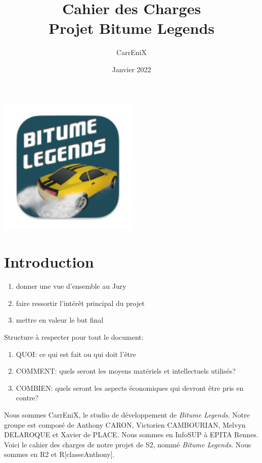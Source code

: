 \documentclass[11pt,a4paper]{article}
\newcommand{\btmlgs}{\textit{Bitume Legends}}
\begin{document}
\title{Cahier des Charges \\ {\large Projet Bitume Legends}}
\author{CarrEniX}
\date{Janvier 2022}
\maketitle

\begin{center}
  \includegraphics[width=0.5\textwidth]{Medias/logo192.png}
\end{center}

\tableofcontents
\clearpage

\section{Introduction}
  \begin{enumerate}
    \item donner une vue d'ensemble au Jury
    \item faire ressortir l'intérêt principal du projet
    \item mettre en valeur le but final
  \end{enumerate}
  Structure à respecter pour tout le document:
  \begin{enumerate}
    \item QUOI: ce qui est fait ou qui doit l'être
    \item COMMENT: quels seront les moyens matériels et intellectuels utilisés?
    \item COMBIEN: quels seront les aspects économiques qui devront être pris en contre?
  \end{enumerate}
  Nous sommes CarrEniX, le studio de développement de \btmlgs. Notre groupe est composé de 
  Anthony CARON, Victorien CAMBOURIAN, Melvyn DELAROQUE et Xavier de PLACE. Nous sommes en InfoSUP à EPITA
  Rennes. Voici le cahier des charges de notre projet de S2, nommé \btmlgs. Nous sommes en R2 et R[classeAnthony].
  
\end{document}
